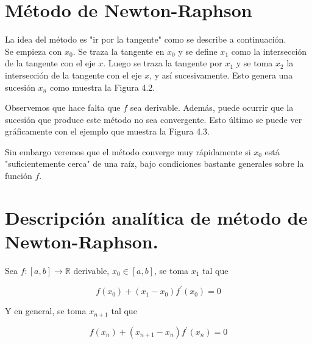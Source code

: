 \documentclass[10pt]{book}
\begin{document}
\section{Método de Newton-Raphson}
La idea del método es "ir por la tangente" como se describe a continuación.\\
Se empieza con $x_{0}$. Se traza la tangente en $x_{0}$ y se define $x_{1}$ como la intersección de la tangente con el eje $x$. Luego se traza la tangente por $x_{1}$ y se toma $x_{2}$ la intersección de la tangente con el eje $x$, y así sucesivamente. Esto genera una sucesión $x_{n}$ como muestra la Figura 4.2.

Observemos que hace falta que $f$ sea derivable. Además, puede ocurrir que la sucesión que produce este método no sea convergente. Esto último se puede ver gráficamente con el ejemplo que muestra la Figura 4.3.

Sin embargo veremos que el método converge muy rápidamente si $x_{0}$ está "suficientemente cerca" de una raíz, bajo condiciones bastante generales sobre la función $f$.

\section*{Descripción analítica de método de Newton-Raphson.}
Sea $f:[a, b] \rightarrow \mathbb{R}$ derivable, $x_{0} \in[a, b]$, se toma $x_{1}$ tal que

$$
f\left(x_{0}\right)+\left(x_{1}-x_{0}\right) f^{\prime}\left(x_{0}\right)=0
$$

Y en general, se toma $x_{n+1}$ tal que

$$
f\left(x_{n}\right)+\left(x_{n+1}-x_{n}\right) f^{\prime}\left(x_{n}\right)=0
$$
\end{document}
